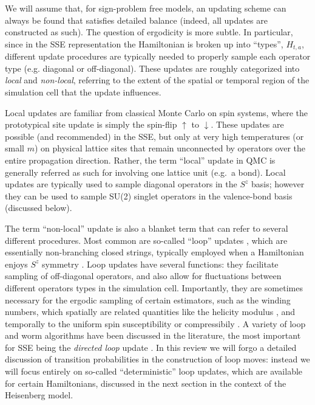 \documentclass[vecphys]{svmult}
\begin{document}
We will assume that, for sign-problem free models, an updating scheme can always be found that satisfies detailed balance (indeed, all updates are constructed as such).  The question of ergodicity is more subtle.  
In particular, since in the SSE representation the Hamiltonian is broken up into ``types'', $H_{t,a}$, different update procedures are typically needed to properly sample each operator type (e.g. diagonal or off-diagonal).  These updates are roughly categorized into {\em local} and {\em non-local}, referring to the extent of the spatial or temporal region of the simulation cell that the update influences.

Local updates are familiar from classical Monte Carlo on spin systems, where the prototypical site update is simply the spin-flip $\uparrow$ to $\downarrow$.  These updates are possible (and recommended) in the SSE, but only at very high temperatures (or small $m$) on physical lattice sites that remain unconnected by operators over the entire propagation direction.  Rather, the term ``local'' update in QMC is generally referred as such for involving one lattice unit (e.g.~a bond).  Local updates are typically used to sample diagonal operators in the $S^z$ basis; however they can be used to sample SU(2) singlet operators in the valence-bond basis (discussed below).

The term ``non-local'' update is also a blanket term that can refer to several different procedures.  Most common are so-called ``loop'' updates \cite{Melko:Evertz93},
which are essentially non-branching closed strings,
typically employed when a Hamiltonian enjoys $S^z$ symmetry \cite{Melko:Sandvik99}.  Loop updates have several functions: they facilitate sampling of off-diagonal operators, and also allow for fluctuations between different operators types in the simulation cell.  Importantly, they are sometimes necessary for the ergodic sampling of certain estimators, such as the winding numbers, which spatially are related quantities like the helicity modulus \cite{Melko:PC}, and temporally to the uniform spin susceptibility or compressibily \cite{Melko:HGEloop}.  A variety of loop and worm algorithms have been discussed in the literature, the most important for SSE being the {\em directed loop} update \cite{Melko:Syljuasen02}.  In this review we will forgo a detailed discussion of transition probabilities in the construction of loop moves: instead we will focus entirely on so-called ``deterministic'' loop updates, which are available for certain Hamiltonians, discussed in the next section in the context of the Heisenberg model.
\end{document}
